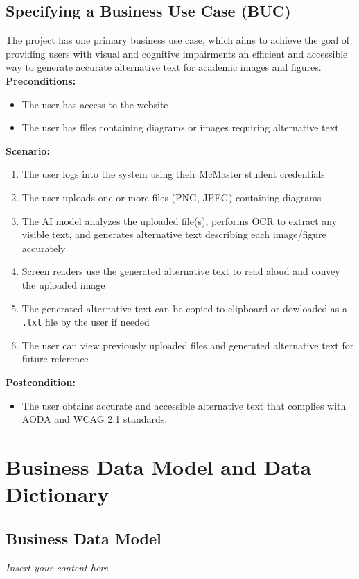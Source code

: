 \documentclass[12pt]{article}
\newcommand{\lips}{\textit{Insert your content here.}}
\begin{document}
\subsection{Specifying a Business Use Case (BUC)}
The project has one primary business use case, which aims to achieve the goal of providing users with visual and cognitive impairments an efficient 
and accessible way to generate accurate alternative text for academic images and figures.\\[1ex]
\textbf{Preconditions:}
\begin{itemize}
  \item The user has access to the website
  \item The user has files containing diagrams or images requiring alternative text
\end{itemize}
\textbf{Scenario:}
\begin{enumerate}
  \item The user logs into the system using their McMaster student credentials
  \item The user uploads one or more files (PNG, JPEG) containing diagrams 
  \item The AI model analyzes the uploaded file(s), performs OCR to extract any visible text, and generates 
  alternative text describing each image/figure accurately
  \item Screen readers use the generated alternative text to read aloud and convey the uploaded image
  \item The generated alternative text can be copied to clipboard or dowloaded as a \texttt{.txt} file by the user if needed
  \item The user can view previously uploaded files and generated alternative text for future reference
\end{enumerate}
\textbf{Postcondition:}
\begin{itemize}
  \item The user obtains accurate and accessible alternative text that complies with AODA and WCAG 2.1 standards.
\end{itemize}

\section{Business Data Model and Data Dictionary}
\subsection{Business Data Model}
\lips
\end{document}
